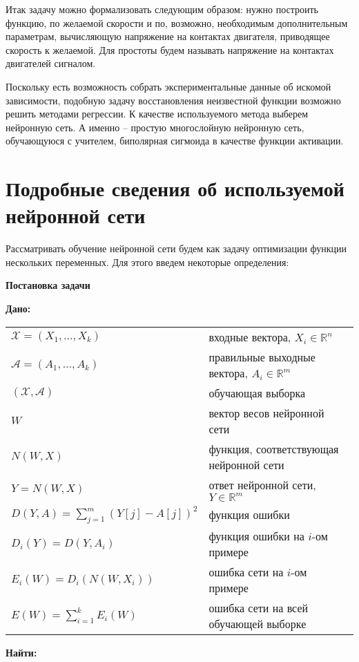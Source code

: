 \documentclass[14pt]{extreport}
\begin{document}
        Итак задачу можно формализовать следующим образом: нужно построить функцию, по желаемой скорости и по, возможно, необходимым дополнительным параметрам, вычисляющую напряжение на контактах двигателя, приводящее скорость к желаемой. Для простоты будем называть напряжение на контактах двигателей сигналом.

        Поскольку есть возможность собрать экспериментальные данные об искомой зависимости, подобную задачу восстановления неизвестной функции возможно решить методами регрессии. К качестве используемого метода выберем нейронную сеть. А именно -- простую многослойную нейронную сеть, обучающуюся с учителем, биполярная сигмоида в качестве функции активации.
\newpage
    \chapter{Подробные сведения об используемой нейронной сети}

    Рассматривать обучение нейронной сети будем как задачу оптимизации функции нескольких переменных. Для этого введем некоторые определения:

    \textbf{Постановка задачи}

{\bf Дано:}

\begin{tabular}{p{6cm} p{7.5cm}}
 $\mathcal{X}=(X_1,\ldots,X_k)$ & входные вектора, $X_i\in\mathbb{R}^n$\\[0.1cm]
 $\mathcal{A}=(A_1,\ldots,A_k)$ & правильные выходные вектора, $A_i\in\mathbb{R}^m$\\[0.1cm]
 $(\mathcal{X},\mathcal{A})$ & обучающая выборка  \\[0.1cm]
 $W$ & вектор весов нейронной сети \\[0.1cm]
 $N(W,X)$ & функция, соответствующая нейронной сети \\[0.1cm]
 $Y=N(W,X)$ & ответ нейронной сети, $Y\in\mathbb{R}^m$ \\[0.1cm]
 $D(Y,A) =\sum_{j=1}^{m} (Y[j]-A[j])^2$ & функция ошибки\\[0.1cm]
 $D_i(Y)=D(Y,A_i) $ & функция ошибки на $i$-ом примере \\[0.1cm]
  $E_i(W)=D_i(N(W,X_i))$ & ошибка сети на $i$-ом примере\\[0.1cm]
  $E(W)=\sum_{i=1}^{k}E_i(W) $ & ошибка сети на всей обучающей выборке \\[0.1cm]
 \end{tabular}

{\bf Найти:}
\end{document}

